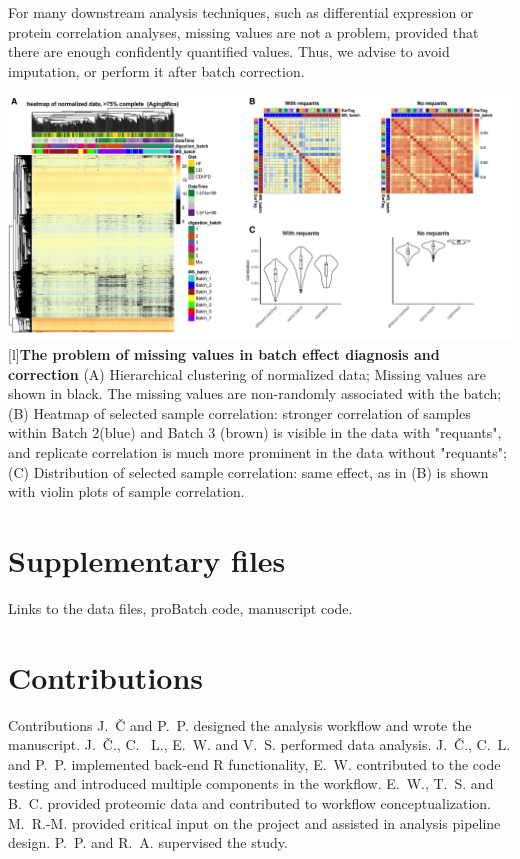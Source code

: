 \documentclass[num-refs]{wiley-article}
\begin{document}
{\begin{tcolorbox}
	For many downstream analysis techniques, such as differential expression or protein correlation analyses, missing values are not a problem, provided that there are enough confidently quantified values. Thus, we advise to avoid imputation, or perform it after batch correction. 
	
		\begin{minipage}[h]{\linewidth}
			\includegraphics[width=.9\textwidth]{figures/Fig4_missing_values.pdf}
			[l]{\textbf{The problem of missing values in batch effect diagnosis and correction} }
			\label{fig:batch_fig4_missing_values}
			{\footnotesize  (A) Hierarchical clustering of normalized data; Missing values are shown in black. The missing values are non-randomly associated with the batch;
				(B) Heatmap of selected sample correlation: stronger correlation of samples within Batch 2(blue) and Batch 3 (brown) is visible in the data with "requants", and replicate correlation is much more prominent in the data without "requants";
			(C) Distribution of selected sample correlation: same effect, as in (B) is shown with violin plots of sample correlation.}
		\end{minipage}
\end{tcolorbox}
	\clearpage
}





\section*{Supplementary files}
Links to the data files, proBatch code, manuscript code.

\section*{Contributions}

Contributions
J.~Č and P.~P. designed the analysis workflow and wrote the manuscript. J.~Č., C. ~L., E.~W. and V.~S. performed data analysis. J.~Č., C.~L. and P.~P. implemented back-end R functionality, E.~W. contributed to the code testing and introduced multiple components in the workflow. E.~W., T.~S. and B.~C. provided proteomic data and contributed to workflow conceptualization. M.~R.-M. provided critical input on the project and assisted in analysis pipeline design. P.~P. and R.~A. supervised the study.
\end{document}
